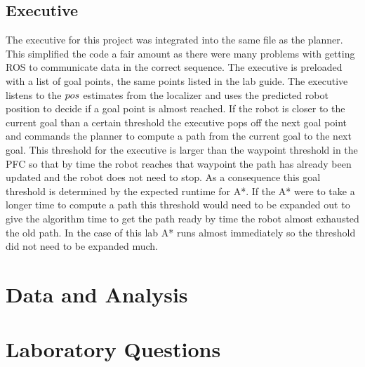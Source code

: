 \documentclass[letterpaper,12pt]{article}
\begin{document}
\subsection{Executive}
The executive for this project was integrated into the same file as the planner. This simplified the code a fair amount as there were many problems with getting ROS to communicate data in the correct sequence. The executive is preloaded with a list of goal points, the same points listed in the lab guide. The executive listens to the $\\pos$ estimates from the localizer and uses the predicted robot position to decide if a goal point is almost reached. If the robot is closer to the current goal than a certain threshold the executive pops off the next goal point and commands the planner to compute a path from the current goal to the next goal. This threshold for the executive is larger than the waypoint threshold in the PFC so that by time the robot reaches that waypoint the path has already been updated and the robot does not need to stop. As a consequence this goal threshold is determined by the expected runtime for A*. If the A* were to take a longer time to compute a path this threshold would need to be expanded out to give the algorithm time to get the path ready by time the robot almost exhausted the old path. In the case of this lab A* runs almost immediately so the threshold did not need to be expanded much.
\section{Data and Analysis}

\section{Laboratory Questions}









\end{document}
